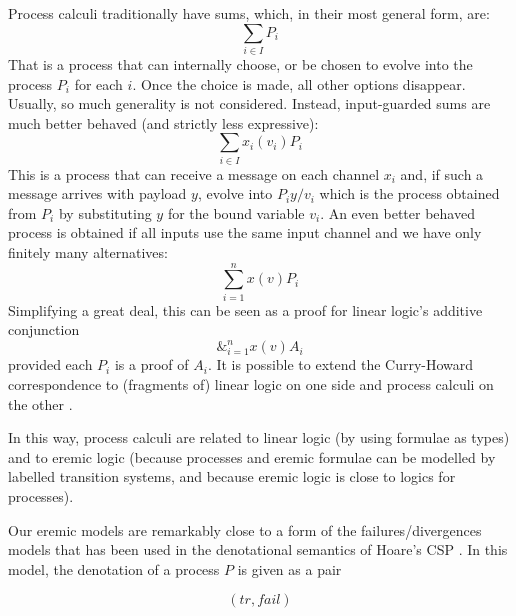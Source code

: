 Process calculi traditionally have sums, which, in their most general
form, are:
\[
     \sum_{i \in I} P_i
\]
That is a process that can internally choose, or be chosen to evolve
into the process $P_i$ for each $i$. Once the choice is made, all
other options disappear.  Usually, so much generality is not
considered. Instead, input-guarded sums are much better behaved (and
strictly less expressive):
  \[
     \sum_{i \in I} x_{i}(v_i)P_i
  \]
This is a process that can receive a message on each channel $x_i$
and, if such a message arrives with payload $y$, evolve into
$P_i{y/v_i}$ which is the process obtained from $P_i$ by substituting
$y$ for the bound variable $v_i$.  An even better behaved process is
obtained if all inputs use the same input channel and we have only
finitely many alternatives:
  \[
     \sum_{i = 1}^n x(v)P_i
  \]
  Simplifying a great deal, this can be seen as a proof for linear
  logic's additive conjunction
  \[
     \&_{i = 1}^n x(v)A_i
  \]
  provided each $P_i$ is a proof of $A_i$.  It is possible to extend
  the Curry-Howard correspondence to (fragments of) linear logic on
  one side and process calculi on the other \cite{GaySJ:typcalosp}.

In this way, process calculi are related to linear logic (by using
formulae as types) and to eremic logic (because processes and eremic
formulae can be modelled by labelled transition systems, and because
eremic logic is close to logics for processes).

 Our eremic models are remarkably
close to a form of the failures/divergences models that has been used
in the denotational semantics of Hoare's CSP
\cite{HoareC:comseq,RoscoeAW:theapoc}.  In this model, the denotation
of a process $P$ is given as a pair

\[
   (tr, fail)
\]

